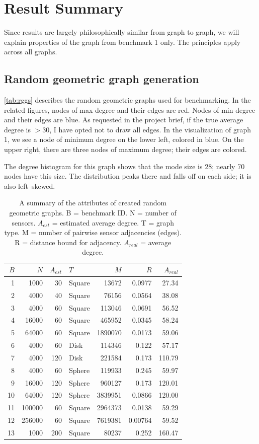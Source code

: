 \documentclass[oneside, titlepage]{scrartcl}
\begin{document}
\section{Result Summary}

Since results are largely philosophically similar from graph to graph, we will explain properties of the graph from benchmark 1 only. The principles apply across all graphs.

\subsection{Random geometric graph generation}
\autoref{tab:rggs} describes the random geometric graphs used for benchmarking. In the related figures, nodes of max degree and their edges are red. Nodes of min degree and their edges are blue. As requested in the project brief, if the true average degree is $> 30$, I have opted not to draw all edges. In the visualization of graph 1, we see a node of minimum degree on the lower left, colored in blue. On the upper right, there are three nodes of maximum degree; their edges are colored.

The degree histogram for this graph shows that the mode size is 28; nearly 70 nodes have this size. The distribution peaks there and falls off on each side; it is also left--skewed.
\begin{table}[h]
\small
\centering
\begin{tabular}{r r r l | r r r}
$B$ & $N$ & $A_{est}$ & $T$ & $M$ & $R$ & $A_{real}$ \\
\hline
1 & 1000 & 30 & Square & 13672 & 0.0977 & 27.34\\
2 & 4000 & 40 & Square & 76156 & 0.0564 & 38.08\\
3 & 4000 & 60 & Square & 113046 & 0.0691 & 56.52\\
4 & 16000 & 60 & Square & 465952 & 0.0345 & 58.24\\
5 & 64000 & 60 & Square & 1890070 & 0.0173 & 59.06\\
6 & 4000 & 60 & Disk &114346 & 0.122 & 57.17\\
7 & 4000 & 120 & Disk & 221584 & 0.173 & 110.79\\
8 & 4000 & 60 & Sphere & 119933 & 0.245 & 59.97\\
9 & 16000 & 120 & Sphere & 960127 & 0.173 & 120.01\\
10 & 64000 & 120 & Sphere & 3839951 & 0.0866 & 120.00\\
11 & 100000 & 60 & Square & 2964373 & 0.0138 & 59.29\\
12 & 256000 & 60 & Square & 7619381 & 0.00764 & 59.52\\
13 & 1000 & 200 & Square & 80237 & 0.252 & 160.47\\
\end{tabular}
\caption{A summary of the attributes of created random geometric graphs. B = benchmark ID. N = number of sensors. $A_{est}$  = estimated average degree. T = graph type. M = number of pairwise sensor adjacencies (edges). R = distance bound for adjacency. $A_{real}$ = average degree.}
\label{tab:rggs}
\end{table}
\end{document}

